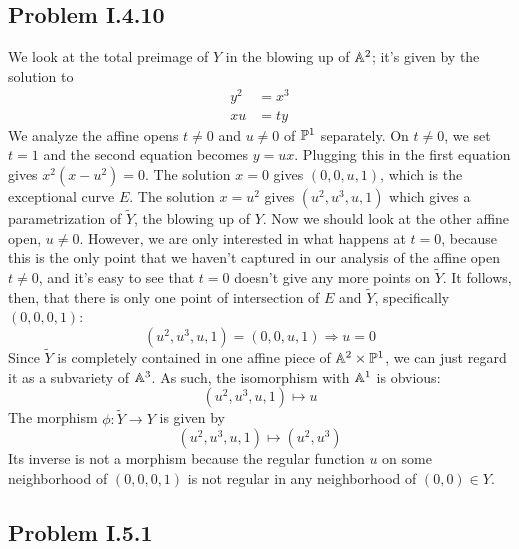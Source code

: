 \documentclass{mathnotes}
\begin{document}
\subsection*{Problem I.4.10}
We look at the total preimage of $Y$ in the blowing up of $\mathbb{A}^2$; it's given by the solution to
\begin{align*}
y^2 &= x^3 \\
xu &= ty
\end{align*}
We analyze the affine opens $t\neq 0$ and $u\neq 0$ of $\mathbb{P}^1$ separately. On $t\neq 0$, we set $t=1$ 
and the second equation becomes $y = ux$. Plugging this in the first equation gives $x^2(x-u^2) =0$. The solution
$x=0$ gives $(0,0,u,1)$, which is the exceptional curve $E$. The solution $x = u^2$ gives $(u^2, u^3, u, 1)$ which
gives a parametrization of $\tilde Y$, the blowing up of $Y$. Now we should look at the other affine open, $u\neq 0$.
However, we are only interested in what happens at $t=0$, because this is the only point that we haven't captured
in our analysis of the affine open $t\neq 0$, and it's easy to see that $t=0$ doesn't give any more points on $\tilde Y$.
It follows, then, that there is only one point of intersection of $E$ and $\tilde Y$, specifically $(0,0,0,1)$:
\[     (u^2, u^3, u, 1) = (0, 0, u, 1) \Rightarrow u=0        \]
Since $\tilde Y$ is completely contained in one affine piece of $\mathbb{A}^2 \times \mathbb{P}^1$, we can just regard it as a subvariety
of $\mathbb{A}^3$. As such, the isomorphism with $\mathbb{A}^1$ is obvious:
\[         (u^2, u^3, u, 1) \mapsto u     \]
The morphism $\phi : \tilde Y \to Y$ is given by
\[         (u^2, u^3, u, 1) \mapsto  (u^2, u^3)     \]
Its inverse is not a morphism because the regular function $u$ on some neighborhood of $(0,0,0,1)$ is not regular in any
neighborhood of $(0,0) \in Y$.


\subsection*{Problem I.5.1}
\end{document}

